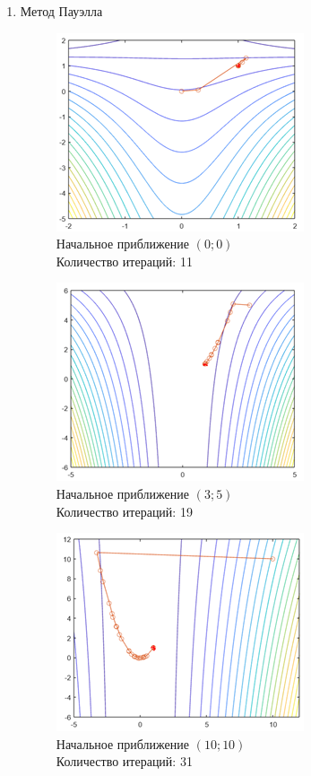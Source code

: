 \documentclass[12pt]{article}
\begin{document}
\begin{enumerate}
\begin{enumerate}
	\item Метод Пауэлла
	\begin{figure}[H]
	\begin{minipage}{.5\textwidth}
    	\centering
    	\includegraphics[]{img/f5_2_1.png}
    	\\ Начальное приближение $\left( 0; 0 \right)$
    	\\ Количество итераций: 11
	\end{minipage}
	\begin{minipage}{.5\textwidth}
    	\centering
    	\includegraphics[]{img/f5_2_2.png}
    	\\ Начальное приближение $\left( 3; 5 \right)$
    	\\ Количество итераций: 19
	\end{minipage}
    \end{figure}

	\begin{figure}[H]
    	\centering
    	\includegraphics[]{img/f5_2_3.png}
    	\\ Начальное приближение $\left( 10; 10 \right)$
    	\\ Количество итераций: 31
    \end{figure}


\end{enumerate}
\end{enumerate}
\end{document}
